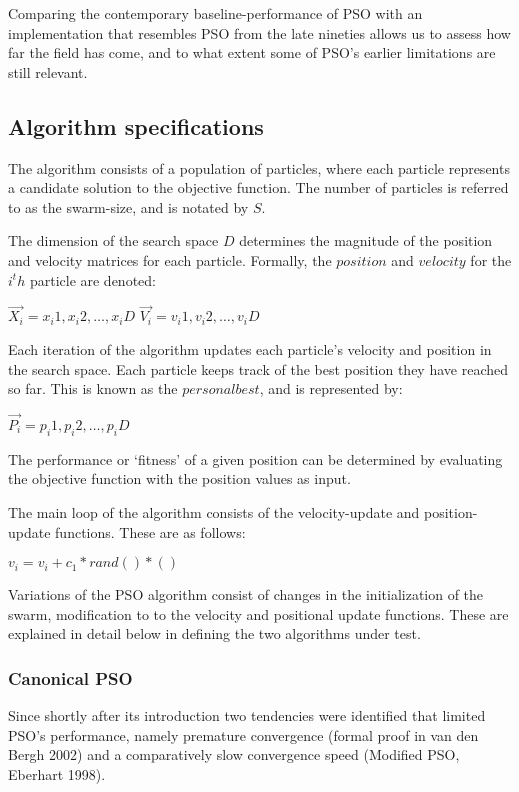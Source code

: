 \documentclass{csfourzero}
\begin{document}
Comparing the contemporary baseline-performance of PSO with an implementation
that resembles PSO from the late nineties allows us to assess how far the field
has come, and to what extent some of PSO's earlier limitations are still
relevant.

\subsection{Algorithm specifications}

The algorithm consists of a population of particles, where each particle
represents a candidate solution to the objective function.  The number of
particles is referred to as the swarm-size, and is notated by $S$.

The dimension of the search space $D$ determines the magnitude of the position
and velocity matrices for each particle. Formally, the $position$ and $velocity$
for the $i^th$ particle are denoted:

$\overrightarrow{X_i} = x_i1, x_i2,\ldots,x_iD$
$\overrightarrow{V_i} = v_i1, v_i2,\ldots,v_iD$

Each iteration of the algorithm updates each particle's velocity and position in
the search space.  Each particle keeps track of the best position they have
reached so far. This is known as the $personal best$, and is represented by:


$\overrightarrow{P_i} = p_i1, p_i2,\ldots,p_iD$

The performance or `fitness' of a given position can be determined by evaluating
the objective function with the position values as input.

The main loop of the algorithm consists of the velocity-update and
position-update functions. These are as follows:

$v_i = v_i + c_1 * rand() * ()$

Variations of the PSO algorithm consist of changes in the initialization of the
swarm, modification to to the velocity and positional update functions. These
are explained in detail below in defining the two algorithms under test.

\subsubsection{Canonical PSO}

Since shortly after its introduction two tendencies were identified that limited
PSO's performance, namely premature convergence (formal proof in van den Bergh
2002) and a comparatively slow convergence speed (Modified PSO, Eberhart 1998).
\end{document}
